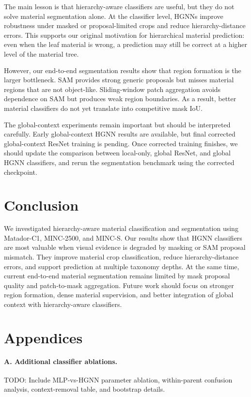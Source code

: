 \documentclass[11pt,twocolumn,letterpaper]{article}
\begin{document}
The main lesson is that hierarchy-aware classifiers are useful, but they do not solve material segmentation alone. At the classifier level, HGNNs improve robustness under masked or proposal-limited crops and reduce hierarchy-distance errors. This supports our original motivation for hierarchical material prediction: even when the leaf material is wrong, a prediction may still be correct at a higher level of the material tree.

However, our end-to-end segmentation results show that region formation is the larger bottleneck. SAM provides strong generic proposals but misses material regions that are not object-like. Sliding-window patch aggregation avoids dependence on SAM but produces weak region boundaries. As a result, better material classifiers do not yet translate into competitive mask IoU.

The global-context experiments remain important but should be interpreted carefully. Early global-context HGNN results are available, but final corrected global-context ResNet training is pending. Once corrected training finishes, we should update the comparison between local-only, global ResNet, and global HGNN classifiers, and rerun the segmentation benchmark using the corrected checkpoint.

\section{Conclusion}

We investigated hierarchy-aware material classification and segmentation using Matador-C1, MINC-2500, and MINC-S. Our results show that HGNN classifiers are most valuable when visual evidence is degraded by masking or SAM proposal mismatch. They improve material crop classification, reduce hierarchy-distance errors, and support prediction at multiple taxonomy depths. At the same time, current end-to-end material segmentation remains limited by mask proposal quality and patch-to-mask aggregation. Future work should focus on stronger region formation, dense material supervision, and better integration of global context with hierarchy-aware classifiers.

\section{Appendices}

\paragraph{A. Additional classifier ablations.}
TODO: Include MLP-vs-HGNN parameter ablation, within-parent confusion analysis, context-removal table, and bootstrap details.
\end{document}
